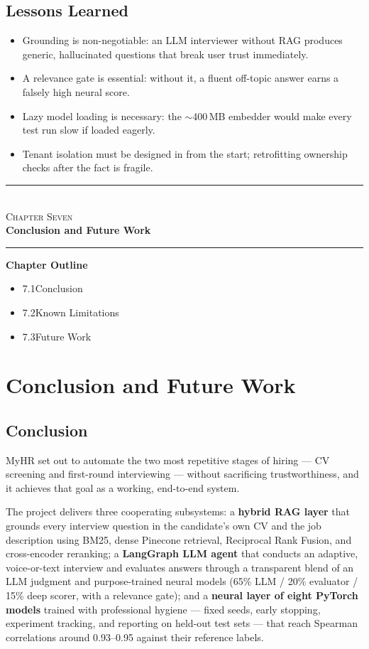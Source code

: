 \documentclass[12pt,a4paper,oneside]{report}
\newcommand{\chapterfrontpage}[3]{%
  \clearpage
  \thispagestyle{empty}
  \vspace*{4cm}
  \begin{center}
    \textcolor{ainshams}{\rule{0.6\linewidth}{1.5pt}}\\[0.6cm]
    {\LARGE\textsc{#1}}\\[0.8cm]
    {\Huge\bfseries #2}\\[0.6cm]
    \textcolor{ainshams}{\rule{0.6\linewidth}{1.5pt}}
  \end{center}
  \vspace{1.8cm}
  \begin{center}
    \begin{minipage}{0.72\linewidth}
      \textbf{\large Chapter Outline}\\[6pt]
      \begin{itemize}[leftmargin=1.4em]
        #3
      \end{itemize}
    \end{minipage}
  \end{center}
  \clearpage
}
\begin{document}
\section{Lessons Learned}

\begin{itemize}
  \item Grounding is non-negotiable: an LLM interviewer without RAG produces generic,
    hallucinated questions that break user trust immediately.
  \item A relevance gate is essential: without it, a fluent off-topic answer earns a falsely
    high neural score.
  \item Lazy model loading is necessary: the $\sim$400\,MB embedder would make every test run
    slow if loaded eagerly.
  \item Tenant isolation must be designed in from the start; retrofitting ownership checks
    after the fact is fragile.
\end{itemize}

\chapterfrontpage{Chapter Seven}{Conclusion and Future Work}{%
  \item 7.1\quad Conclusion
  \item 7.2\quad Known Limitations
  \item 7.3\quad Future Work
}

\chapter{Conclusion and Future Work}
\label{ch:conclusion}

\section{Conclusion}

MyHR set out to automate the two most repetitive stages of hiring --- CV screening and
first-round interviewing --- without sacrificing trustworthiness, and it achieves that goal as
a working, end-to-end system.

The project delivers three cooperating subsystems: a \textbf{hybrid RAG layer} that grounds
every interview question in the candidate's own CV and the job description using BM25, dense
Pinecone retrieval, Reciprocal Rank Fusion, and cross-encoder reranking; a \textbf{LangGraph
LLM agent} that conducts an adaptive, voice-or-text interview and evaluates answers through a
transparent blend of an LLM judgment and purpose-trained neural models (65\% LLM / 20\%
evaluator / 15\% deep scorer, with a relevance gate); and a \textbf{neural layer of eight
PyTorch models} trained with professional hygiene --- fixed seeds, early stopping, experiment
tracking, and reporting on held-out test sets --- that reach Spearman correlations around
0.93--0.95 against their reference labels.
\end{document}
